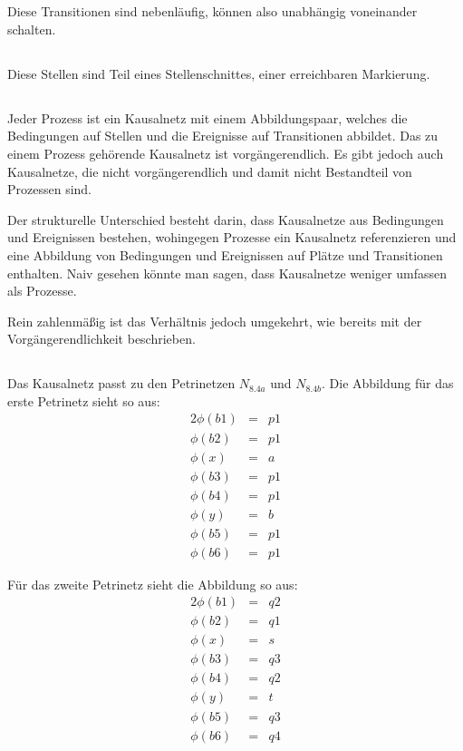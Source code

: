 \documentclass[10pt,a4paper,oneside,ngerman,numbers=noenddot]{scrartcl}
\begin{document}
\section{} %
	\subsection{}
	Diese Transitionen sind nebenläufig, können also unabhängig voneinander schalten.
	\subsection{}
	Diese Stellen sind Teil eines Stellenschnittes, einer erreichbaren Markierung.
	\subsection{}
	Jeder Prozess ist ein Kausalnetz mit einem Abbildungspaar, welches die Bedingungen auf Stellen und die Ereignisse auf Transitionen abbildet. Das zu einem Prozess gehörende Kausalnetz ist vorgängerendlich. Es gibt jedoch auch Kausalnetze, die nicht vorgängerendlich und damit nicht Bestandteil von Prozessen sind.
	
	Der strukturelle Unterschied besteht darin, dass Kausalnetze aus Bedingungen und Ereignissen bestehen, wohingegen Prozesse ein Kausalnetz referenzieren und eine Abbildung von Bedingungen und Ereignissen auf Plätze und Transitionen enthalten. Naiv gesehen könnte man sagen, dass Kausalnetze weniger umfassen als Prozesse.
	
	Rein zahlenmäßig ist das Verhältnis jedoch umgekehrt, wie bereits mit der Vorgängerendlichkeit beschrieben.
	\subsection{}
	Das Kausalnetz passt zu den Petrinetzen \(N_{8.4a}\) und \(N_{8.4b}\). Die Abbildung für das erste Petrinetz sieht so aus:
	\begin{alignat*}{2}
		\phi(b1) &=& p1 \\
		\phi(b2) &=& p1 \\
		\phi(x) &=& a \\
		\phi(b3) &=& p1 \\
		\phi(b4) &=& p1 \\
		\phi(y) &=& b \\
		\phi(b5) &=& p1 \\
		\phi(b6) &=& p1
	\end{alignat*}
	
	Für das zweite Petrinetz sieht die Abbildung so aus:
	\begin{alignat*}{2}
		\phi(b1) &=& q2 \\
		\phi(b2) &=& q1 \\
		\phi(x) &=& s \\
		\phi(b3) &=& q3 \\
		\phi(b4) &=& q2 \\
		\phi(y) &=& t \\
		\phi(b5) &=& q3 \\
		\phi(b6) &=& q4
	\end{alignat*}
\end{document}
